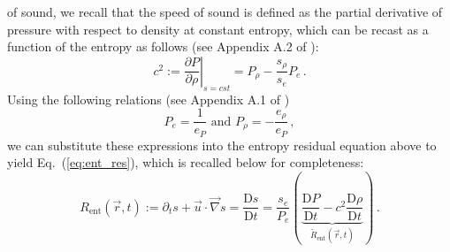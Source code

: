 \documentclass[review,10pt]{elsarticle}
\newcommand{\grad}{\vec{\nabla}}
\newcommand{\resi}{R_\text{ent}}
\newcommand{\resinew}{\widetilde{R}_\text{ent}}
\newcommand{\matder}[1]{\frac{\textrm{D} #1}{\textrm{D} t}}
\newcommand{\eqt}[1]{Eq.~(\ref{#1})}                     %
\begin{document}
of sound, we recall that the speed of sound is defined as the partial derivative of pressure with respect to density 
at constant entropy, which can be recast as a function of the entropy as follows (see Appendix A.2 of \cite{jlg}):
%
\begin{equation*}
c^2 := \left. \frac{\partial P}{\partial \rho} \right|_{s=cst} = P_{\rho} - \frac{s_{\rho}}{s_e} P_e   \, .
\end{equation*}
%
Using the following relations (see Appendix A.1 of \cite{jlg})
%
\begin{equation*}
P_e = \frac{1}{e_P} \text{ and } P_{\rho} = -\frac{e_{\rho}}{e_P}  \, ,
\end{equation*}
%
we can substitute these expressions into the entropy residual equation above to yield \eqt{eq:ent_res}, which is recalled 
below for completeness:
%
\begin{equation*}
\resi(\vec{r},t) := \partial_t s + \vec{u} \cdot \grad s = \matder{s} = \frac{s_e}{P_e} \left( \underbrace{\matder{P} - c^2 \matder{\rho} }_{\resinew(\vec{r},t)} \right) \, .
\end{equation*} 

\newpage
\end{document}
